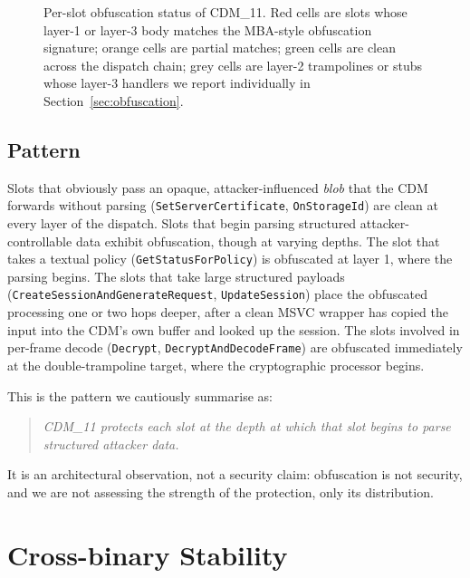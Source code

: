 \documentclass[11pt,letterpaper]{article}
\let\oldsection\section
\renewcommand{\section}{\clearpage\oldsection}
\begin{document}
\begin{figure}[t]
{%
}%
\caption{Per-slot obfuscation status of CDM\_11. Red cells are slots
whose layer-1 or layer-3 body matches the MBA-style obfuscation
signature; orange cells are partial matches; green cells are clean
across the dispatch chain; grey cells are layer-2 trampolines or
stubs whose layer-3 handlers we report individually in
Section~\ref{sec:obfuscation}.}
\label{fig:obfuscation-grid}
\end{figure}

\subsection{Pattern}

Slots that obviously pass an opaque, attacker-influenced \emph{blob}
that the CDM forwards without parsing
(\texttt{SetServerCertificate}, \texttt{OnStorageId}) are clean at
every layer of the dispatch. Slots that begin parsing structured
attacker-controllable data exhibit obfuscation, though at varying
depths. The slot that takes a textual policy
(\texttt{GetStatusForPolicy}) is obfuscated at layer 1, where the
parsing begins. The slots that take large structured payloads
(\texttt{CreateSessionAndGenerateRequest},
\texttt{UpdateSession}) place the obfuscated processing one or two
hops deeper, after a clean MSVC wrapper has copied the input into
the CDM's own buffer and looked up the session. The slots involved
in per-frame decode (\texttt{Decrypt},
\texttt{DecryptAndDecodeFrame}) are obfuscated immediately at the
double-trampoline target, where the cryptographic processor begins.

This is the pattern we cautiously summarise as:

\begin{quote}\itshape
CDM\_11 protects each slot at the depth at which that slot begins
to parse structured attacker data.
\end{quote}

\noindent It is an architectural observation, not a security claim:
obfuscation is not security, and we are not assessing the strength
of the protection, only its distribution.

\section{Cross-binary Stability}
\label{sec:cross}
\end{document}
